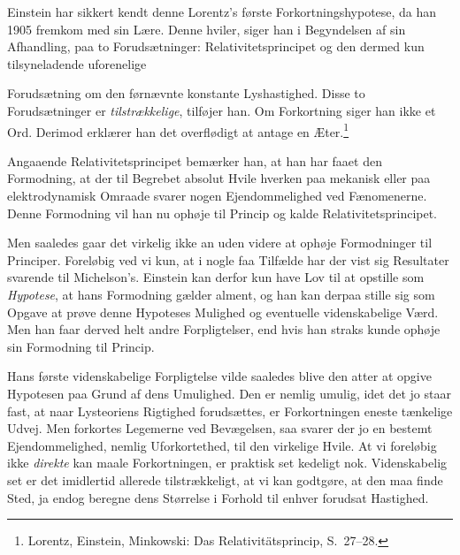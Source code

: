 \documentclass[12pt,a4paper]{article}
\newcommand{\opage}[1]{\marginnote{\footnotesize\textit{[#1]}}}
\begin{document}
Einstein har sikkert kendt denne Lorentz's første Forkortningshypotese, da han
1905 fremkom med sin Lære. Denne hviler, siger han i Begyndelsen af sin
Afhandling, paa to Forudsætninger: Relativitetsprincipet og den dermed
\guillemotleft kun tilsyneladende uforenelige\guillemotright{}

\opage{198} Forudsætning om den førnævnte konstante Lyshastighed. Disse to Forudsætninger
er \emph{tilstrækkelige}, tilføjer han. Om Forkortning siger han ikke et Ord.
Derimod erklærer han det overflødigt at antage en
Æter.\footnote{Lorentz, Einstein, Minkowski: Das Relativitätsprincip,
S.\ 27--28.}

Angaaende \guillemotleft Relativitetsprincipet\guillemotright{} bemærker han,
at han har faaet den Formodning, at der til Begrebet absolut Hvile hverken paa
mekanisk eller paa elektrodynamisk Omraade svarer nogen Ejendommelighed ved
Fænomenerne. Denne Formodning vil han nu \guillemotleft ophøje til
Princip\guillemotright{} og kalde Relativitetsprincipet.

Men saaledes gaar det virkelig ikke an uden videre at ophøje Formodninger til
\guillemotleft Principer\guillemotright. Foreløbig ved vi kun, at i nogle faa
Tilfælde har der vist sig Resultater svarende til Michelson's. Einstein kan
derfor kun have Lov til at opstille som \emph{Hypotese}, at hans Formodning
gælder alment, og han kan derpaa stille sig som Opgave at prøve denne Hypoteses
Mulighed og eventuelle videnskabelige Værd. Men han faar derved helt andre
Forpligtelser, end hvis han straks kunde ophøje sin Formodning til Princip.

Hans første videnskabelige Forpligtelse vilde saaledes blive den atter at
opgive Hypotesen paa Grund af dens Umulighed. Den er nemlig umulig, idet det jo
staar fast, at naar Lysteoriens Rigtighed forudsættes, er Forkortningen eneste
tænkelige Udvej. Men forkortes Legemerne ved Bevægelsen, saa svarer der jo en
bestemt Ejendommelighed, nemlig Uforkortethed, til den virkelige Hvile. At vi
foreløbig ikke \emph{direkte} kan maale Forkortningen, er praktisk set
kedeligt nok. Videnskabelig set er det imidlertid allerede tilstrækkeligt, at
vi kan godtgøre, at den maa finde Sted, ja endog beregne dens Størrelse i
Forhold til enhver forudsat Hastighed.
\end{document}

